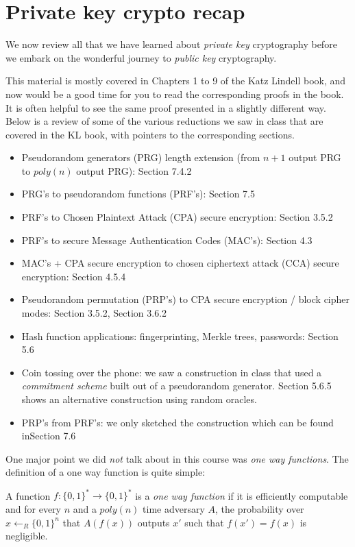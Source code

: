 \chapter{Private key crypto recap}\label{9-Private-key-crypto-rec}

We now review all that we have learned about \emph{private key}
cryptography before we embark on the wonderful journey to \emph{public
key} cryptography.

This material is mostly covered in Chapters 1 to 9 of the Katz Lindell
book, and now would be a good time for you to read the corresponding
proofs in the book. It is often helpful to see the same proof presented
in a slightly different way. Below is a review of some of the various
reductions we saw in class that are covered in the KL book, with
pointers to the corresponding sections.

\begin{itemize}
\tightlist
\item
  Pseudorandom generators (PRG) length extension (from \(n+1\) output
  PRG to \(poly(n)\) output PRG): Section 7.4.2
\item
  PRG's to pseudorandom functions (PRF's): Section 7.5
\item
  PRF's to Chosen Plaintext Attack (CPA) secure encryption: Section
  3.5.2
\item
  PRF's to secure Message Authentication Codes (MAC's): Section 4.3
\item
  MAC's + CPA secure encryption to chosen ciphertext attack (CCA) secure
  encryption: Section 4.5.4
\item
  Pseudorandom permutation (PRP's) to CPA secure encryption / block
  cipher modes: Section 3.5.2, Section 3.6.2
\item
  Hash function applications: fingerprinting, Merkle trees, passwords:
  Section 5.6
\item
  Coin tossing over the phone: we saw a construction in class that used
  a \emph{commitment scheme} built out of a pseudorandom generator.
  Section 5.6.5 shows an alternative construction using random oracles.
\item
  PRP's from PRF's: we only sketched the construction which can be found
  inSection 7.6
\end{itemize}

One major point we did \emph{not} talk about in this course was
\emph{one way functions}. The definition of a one way function is quite
simple:

A function \(f:\{0,1\}^*\rightarrow\{0,1\}^*\) is a \emph{one way
function} if it is efficiently computable and for every \(n\) and a
\(poly(n)\) time adversary \(A\), the probability over
\(x\leftarrow_R\{0,1\}^n\) that \(A(f(x))\) outputs \(x'\) such that
\(f(x')=f(x)\) is negligible.

